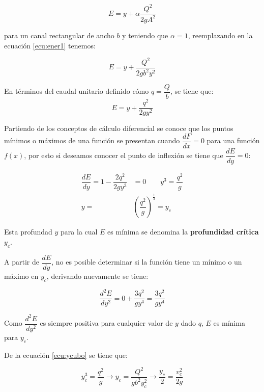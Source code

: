 \documentclass[a4paper, 11pt]{article}
\begin{document}
\begin{equation}
    E=y+\alpha \dfrac{Q^{2}}{2gA^{2}}
    \label{ecu:ener1}
\end{equation}

para un canal rectangular de ancho $b$ y teniendo que $\alpha=1$, reemplazando en la ecuación \ref{ecu:ener1} tenemos:

\begin{equation}
    E=y+\dfrac{Q^{2}}{2gb^{2}y^{2}}
\end{equation}

En términos del caudal unitario definido cómo $q=\dfrac{Q}{b}$, se tiene que:
\begin{equation}
    E=y+\dfrac{q^{2}}{2gy^{2}}
\end{equation}

Partiendo de los conceptos de cálculo diferencial se conoce que los puntos mínimos o máximos de una función se presentan cuando $\dfrac{dF}{dx}=0$ para una función $f(x)$, por esto si deseamos conocer el punto de inflexión se tiene que $\dfrac{dE}{dy}=0$:

\begin{equation}
    \begin{aligned}
       \dfrac{dE}{dy}=1-\dfrac{2q^{2}}{2gy^{3}}&=0 \qquad y^{3}=\dfrac{q^{2}}{g} \\
       y=&\left(\dfrac{q^{2}}{g}\right)^{\frac{1}{3}}=y_c
    \end{aligned}
    \label{ecu:ycubo}
\end{equation}

Esta profundad $y$ para la cual $E$ es mínima se denomina la \textbf{profundidad crítica} $y_c$. \vspace{1ex}

A partir de $\dfrac{dE}{dy}$, no es posible determinar si la función tiene un mínimo o un máximo en $y_c$, derivando nuevamente se tiene:

\begin{equation}
    \dfrac{d^{2}E}{dy^{2}}=0+\dfrac{3q^{2}}{gy^{4}}=\dfrac{3q^{2}}{gy^{4}}
\end{equation}

Como $\dfrac{d^{2}E}{dy^{2}}$ es siempre positiva para cualquier valor de $y$ dado $q$, $E$ es mínima para $y_c$. \vspace{1ex}

De la ecuación \ref{ecu:ycubo} se tiene que:

\begin{equation}
    y_{c}^{3}=\dfrac{q^{2}}{g}\rightarrow y_{c}=\dfrac{Q^{2}}{gb^{2}y_{c}^{2}} \rightarrow \dfrac{y_{c}}{2}=\dfrac{v_c^{2}}{2g}
\end{equation}
\end{document}
